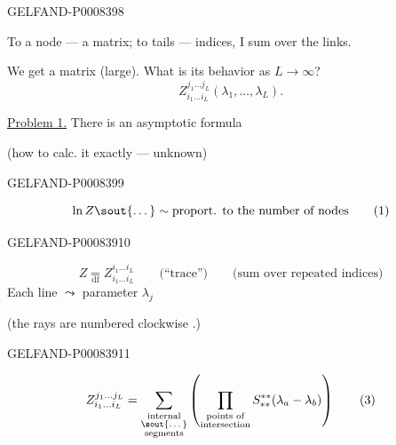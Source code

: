 \begin{GelfandAdjacentEvidence}{GELFAND-P000839}{8}


To a node — a matrix; to tails — indices, I sum over the links.

We get a matrix (large). What is its behavior as \(L\to\infty\)?
\[
Z^{j_1\ldots j_L}_{i_1\ldots i_L}(\lambda_1,\ldots,\lambda_L).
\]

\uline{Problem 1.} There is an asymptotic formula

(how to calc. it exactly — unknown)
\end{GelfandAdjacentEvidence}
\begin{GelfandAdjacentEvidence}{GELFAND-P000839}{9}

\begin{equation*}
\ln Z\text{\sout{…}}\sim\text{proport. to the number of nodes}
\tag{1}
\end{equation*}
\end{GelfandAdjacentEvidence}
\begin{GelfandAdjacentEvidence}{GELFAND-P000839}{10}


\begin{equation*}
Z\underset{\mathrm{df}}{=}Z^{i_1\ldots i_L}_{i_1\ldots i_L}
\qquad\text{(“trace”)}\qquad\text{(sum over repeated indices)}
\tag{2}
\end{equation*}
Each line \(\leadsto\) parameter \(\lambda_j\)

(the rays are numbered clockwise .)
\end{GelfandAdjacentEvidence}
\begin{GelfandAdjacentEvidence}{GELFAND-P000839}{11}


\begin{equation*}
Z^{j_1\ldots j_L}_{i_1\ldots i_L}
=\sum_{\substack{\text{internal}\\\text{\sout{…}}\\\text{segments}}}
\left(\prod_{\substack{\text{points of}\\\text{intersection}}}
S^{**}_{**}(\lambda_a-\lambda_b)\right)
\tag{3}
\end{equation*}
\end{GelfandAdjacentEvidence}
